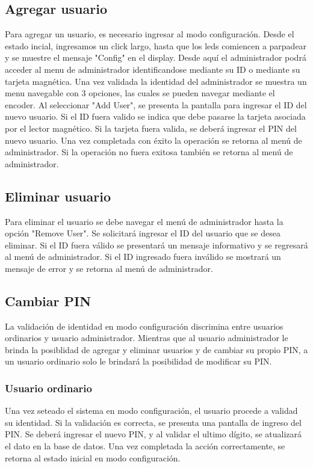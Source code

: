 \documentclass[10pt,a4paper]{article}
\begin{document}
\subsection{Agregar usuario}
Para agregar un usuario, es necesario ingresar al modo configuración. Desde el estado incial, ingresamos un click largo, hasta que los leds comiencen a parpadear y se muestre el mensaje "Config" en el display. Desde aquí el administrador podrá acceder al menu de administrador identificandose mediante su ID o mediante su tarjeta magnética. Una vez validada la identidad del administrador se muestra un menu navegable con 3 opciones, las cuales se pueden navegar mediante el encoder. Al seleccionar "Add User", se presenta la pantalla para ingresar el ID del nuevo usuario. Si el ID fuera valido se indica que debe pasarse la tarjeta asociada por el lector magnético. Si la tarjeta fuera valida, se deberá ingresar el PIN del nuevo usuario. Una vez completada con éxito la operación se retorna al menú de administrador. Si la operación no fuera exitosa también se retorna al menú de administrador.

\subsection{Eliminar usuario}
Para eliminar el usuario se debe navegar el menú de administrador hasta la opción "Remove User". Se solicitará ingresar el ID del usuario que se desea eliminar. Si el ID fuera válido se presentará un mensaje informativo y se regresará al menú de administrador. Si el ID ingresado fuera inválido se mostrará un mensaje de error y se retorna al menú de administrador.

\subsection{Cambiar PIN}
La validación de identidad en modo configuración discrimina entre usuarios ordinarios y usuario administrador. Mientras que al usuario administrador le brinda la posiblidad de agregar y eliminar usuarios y de cambiar su propio PIN, a un usuario ordinario solo le brindará la posibilidad de modificar su PIN.

\subsubsection{Usuario ordinario}
Una vez seteado el sistema en modo configuración, el usuario procede a validad su identidad. Si la validación es correcta, se presenta una pantalla de ingreso del PIN. Se deberá ingresar el nuevo PIN, y al validar el ultimo dígito, se atualizará el dato en la base de datos. Una vez completada la acción correctamente, se retorna al estado inicial en modo configuración.
\end{document}
